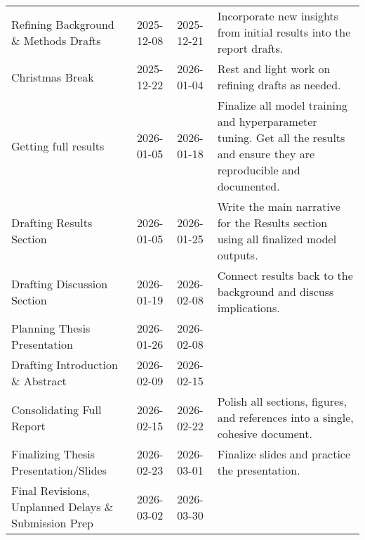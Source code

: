 \documentclass[12pt, letterpaper]{article}
\begin{document}
\begin{table}[h!]
{\begin{tabularx}{\textwidth}{>{\RaggedRight}X l l >{\RaggedRight}X}
            Refining Background \& Methods Drafts                & 2025-12-08          & 2025-12-21        & Incorporate new insights from initial results into the report drafts.                                                       \\

            Christmas Break                                      & 2025-12-22          & 2026-01-04        & Rest and light work on refining drafts as needed.                                                                           \\

            Getting full results                                 & 2026-01-05          & 2026-01-18        & Finalize all model training and hyperparameter tuning. Get all the results and ensure they are reproducible and documented. \\

            Drafting Results Section                             & 2026-01-05          & 2026-01-25        & Write the main narrative for the Results section using all finalized model outputs.                                         \\

            Drafting Discussion Section                          & 2026-01-19          & 2026-02-08        & Connect results back to the background and discuss implications.                                                            \\

            Planning Thesis Presentation                         & 2026-01-26          & 2026-02-08        &                                                                                                                             \\

            Drafting Introduction \& Abstract                    & 2026-02-09          & 2026-02-15        &                                                                                                                             \\

            Consolidating Full Report                            & 2026-02-15          & 2026-02-22        & Polish all sections, figures, and references into a single, cohesive document.                                              \\

            Finalizing Thesis Presentation/Slides                & 2026-02-23          & 2026-03-01        & Finalize slides and practice the presentation.                                                                              \\

            Final Revisions, Unplanned Delays \& Submission Prep & 2026-03-02          & 2026-03-30        &                                                                                                                             \\
        \end{tabularx}
    }
\end{table}
\end{document}
